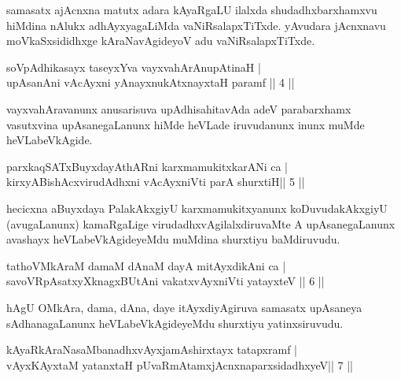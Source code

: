 \begin{artha}
samasatx ajAcnxna matutx adara kAyaRgaLU ilalxda shudadhxbarxhamxvu hiMdina nAlukx adhAyxyagaLiMda vaNiRsalapxTiTxde. yAvudara jAcnxnavu moVkaSxsididhxge kAraNavAgideyoV adu vaNiRsalapxTiTxde.
\end{artha}

\begin{shl}
soVpAdhikasayx taseyxYva vayxvahArAnupAtinaH |\\
upAsanAni vAcAyxni yAnayxnukAtxnayxtaH paramf \hfill||  4 ||  
\end{shl}

\begin{artha}
vayxvahAravanunx anusarisuva upAdhisahitavAda adeV parabarxhamx vasutxvina upAsanegaLanunx hiMde heVLade iruvudanunx inunx muMde heVLabeVkAgide.
\end{artha}


\begin{shl}
parxkaqSATxBuyxdayAthARni karxmamukitxkarANi ca  | \\
kirxyABishAcxvirudAdhxni vAcAyxniVti parA shurxtiH\hfill||  5  ||  
\end{shl}

\begin{artha}
hecicxna aBuyxdaya PalakAkxgiyU karxmamukitxyanunx koDuvudakAkxgiyU (avugaLanunx) kamaRgaLige virudadhxvAgilalxdiruvaMte A upAsanegaLanunx avashayx heVLabeVkAgideyeMdu muMdina shurxtiyu baMdiruvudu.
\end{artha}



\begin{shl}
tathoVMkAraM damaM dAnaM dayA mitAyxdikAni ca  | \\
savoVRpAsatxyXknagxBUtAni vakatxvAyxniVti yatayxteV \hfill||  6 ||   
\end{shl}

\begin{artha}
hAgU OMkAra, dama, dAna, daye itAyxdiyAgiruva samasatx upAsaneya sAdhanagaLanunx heVLabeVkAgideyeMdu shurxtiyu yatinxsiruvudu.
\end{artha}


\begin{shl}
kAyaRkAraNasaMbanadhxvAyxjamAshirxtayx tatapxramf  | \\
vAyxKAyxtaM yatanxtaH pUvaRmAtamxjAcnxnaparxsidadhxyeV\hfill ||  7 ||  
\end{shl}

